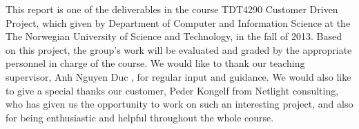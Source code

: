 This report is one of the deliverables in the course TDT4290 Customer Driven Project, which given by Department of Computer and Information Science at the The Norwegian University of Science and Technology, in the fall of 2013. Based on this project, the group's work will be evaluated and graded by the appropriate personnel in charge of the course. 
We would like to thank our teaching supervisor, Anh Nguyen Duc , for regular input and guidance. 
We would also like to give a special thanks our customer, Peder  Kongelf from  Netlight consulting, who has given us the opportunity to work on such an interesting project, and also for being enthusiastic and helpful throughout the whole course.